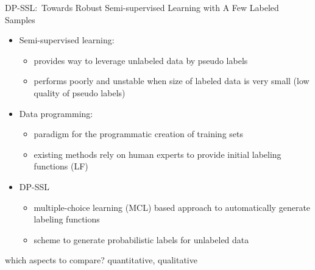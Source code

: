 DP-SSL:\ Towards Robust Semi-supervised Learning with A Few Labeled Samples~\citep{xu_dp-ssl_2021}
\begin{itemize}
    \item Semi-supervised learning:
        \begin{itemize}
            \item provides way to leverage unlabeled data by pseudo labels
            \item performs poorly and unstable when size of labeled data is very small (low quality
                of pseudo labels)
        \end{itemize}
    \item Data programming:
        \begin{itemize}
            \item paradigm for the programmatic creation of training sets
            \item existing methods rely on human experts to provide initial labeling functions (LF)
        \end{itemize}
    \item DP-SSL
        \begin{itemize}
            \item multiple-choice learning (MCL) based approach to automatically generate labeling functions
            \item scheme to generate probabilistic labels for unlabeled data
        \end{itemize}
\end{itemize}

which aspects to compare? quantitative, qualitative
